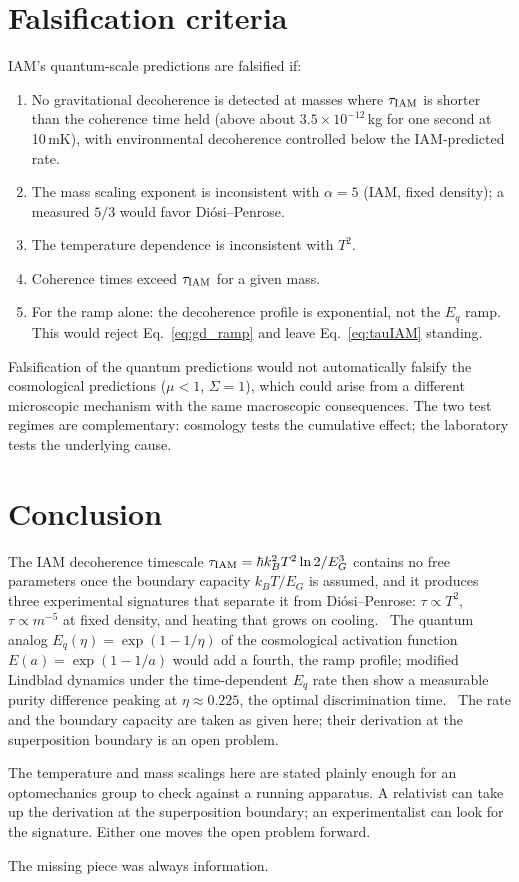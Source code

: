 \section{Falsification criteria}\label{sec:gd_falsify}
IAM's quantum-scale predictions are falsified if:
\begin{enumerate}
\item No gravitational decoherence is detected at masses where $\tau_{\rm IAM}$ is shorter than the coherence time held (above about
$3.5\times10^{-12}$\,kg for one second at 10\,mK), with environmental decoherence controlled below the IAM-predicted rate.
\item The mass scaling exponent is inconsistent with $\alpha=5$ (IAM, fixed density); a measured $5/3$ would favor Di\'osi--Penrose.
\item The temperature dependence is inconsistent with $T^2$.
\item Coherence times exceed $\tau_{\rm IAM}$ for a given mass.
\item For the ramp alone: the decoherence profile is exponential, not the $E_q$ ramp. This would reject Eq.~\eqref{eq:gd_ramp} and leave
Eq.~\eqref{eq:tauIAM} standing.
\end{enumerate}
Falsification of the quantum predictions would not automatically falsify the cosmological predictions ($\mu<1$, $\Sigma=1$), which could arise from a
different microscopic mechanism with the same macroscopic consequences. The two test regimes are complementary: cosmology tests the cumulative effect; the
laboratory tests the underlying cause.

\section{Conclusion}\label{sec:gd_conclusion}
The IAM decoherence timescale $\tau_{\rm IAM}=\hbar k_B^2T^2\ln2/E_G^3$ contains no free parameters once the boundary capacity $k_BT/E_G$ is assumed, and it
produces three experimental signatures that separate it from Di\'osi--Penrose: $\tau\propto T^2$, $\tau\propto m^{-5}$ at fixed density, and heating that
grows on cooling. \prediction\ The quantum analog $E_q(\eta)=\exp(1-1/\eta)$ of the cosmological activation function $E(a)=\exp(1-1/a)$ would add a fourth,
the ramp profile; modified Lindblad dynamics under the time-dependent $E_q$ rate then show a measurable purity difference peaking at $\eta\approx0.225$, the
optimal discrimination time. \conjecture\ The rate and the boundary capacity are taken as given here; their derivation at the superposition boundary is an open problem.
\openprob

The temperature and mass scalings here are stated plainly enough for an optomechanics group to check against a running apparatus. A relativist can take up the derivation at the superposition boundary; an experimentalist can look for the signature. Either one moves the open problem forward.

The missing piece was always information.
